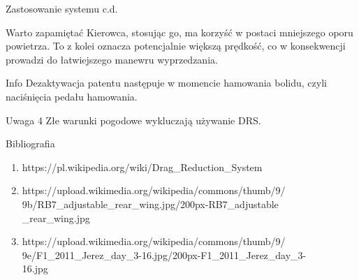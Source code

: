 \documentclass{beamer}
\begin{document}
\begin{frame}{Zastosowanie systemu c.d.}
\centering
\begin{block}{Warto zapamiętać}
Kierowca, stosując go, ma korzyść w postaci mniejszego oporu powietrza. To z kolei oznacza potencjalnie większą prędkość, co w konsekwencji prowadzi do łatwiejszego manewru wyprzedzania.
\end{block}
\begin{exampleblock}{Info}
Dezaktywacja patentu następuje w momencie hamowania bolidu, czyli naciśnięcia pedału hamowania.
\end{exampleblock}
\begin{alertblock}{Uwaga 4}
Złe warunki pogodowe wykluczają używanie DRS.
\end{alertblock}
\end{frame}

\begin{frame}{Bibliografia}
\centering
\begin{enumerate}
\item https://pl.wikipedia.org/wiki/Drag\_Reduction\_System
\item https://upload.wikimedia.org/wikipedia/commons/thumb/9/ \\ 9b/RB7\_adjustable\_rear\_wing.jpg/200px-RB7\_adjustable \\ \_rear\_wing.jpg
\item https://upload.wikimedia.org/wikipedia/commons/thumb/9/ \\ 9e/F1\_2011\_Jerez\_day\_3-16.jpg/200px-F1\_2011\_Jerez\_day\_3- \\ 16.jpg
\end{enumerate}
\end{frame}
\end{document}
